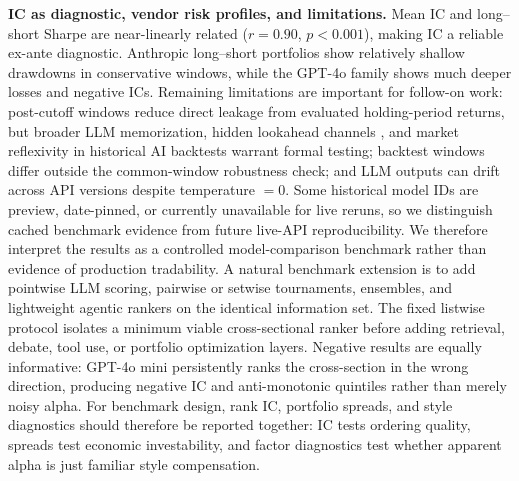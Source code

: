 \textbf{IC as diagnostic, vendor risk profiles, and limitations.}
Mean IC and long--short Sharpe are near-linearly related ($r = 0.90$, $p<0.001$), making IC a reliable ex-ante diagnostic.
Anthropic long--short portfolios show relatively shallow drawdowns in conservative windows, while the GPT-4o family shows much deeper losses and negative ICs.
Remaining limitations are important for follow-on work: post-cutoff windows reduce direct leakage from evaluated holding-period returns, but broader LLM memorization, hidden lookahead channels \citep{gao2025lookahead,merchant2025lookahead}, and market reflexivity in historical AI backtests \citep{koijen2026agentic} warrant formal testing; backtest windows differ outside the common-window robustness check; and LLM outputs can drift across API versions despite temperature $=0$.
Some historical model IDs are preview, date-pinned, or currently unavailable for live reruns, so we distinguish cached benchmark evidence from future live-API reproducibility.
We therefore interpret the results as a controlled model-comparison benchmark rather than evidence of production tradability.
A natural benchmark extension is to add pointwise LLM scoring, pairwise or setwise tournaments, ensembles, and lightweight agentic rankers on the identical information set.
The fixed listwise protocol isolates a minimum viable cross-sectional ranker before adding retrieval, debate, tool use, or portfolio optimization layers.
Negative results are equally informative: GPT-4o mini persistently ranks the cross-section in the wrong direction, producing negative IC and anti-monotonic quintiles rather than merely noisy alpha.
For benchmark design, rank IC, portfolio spreads, and style diagnostics should therefore be reported together: IC tests ordering quality, spreads test economic investability, and factor diagnostics test whether apparent alpha is just familiar style compensation.

